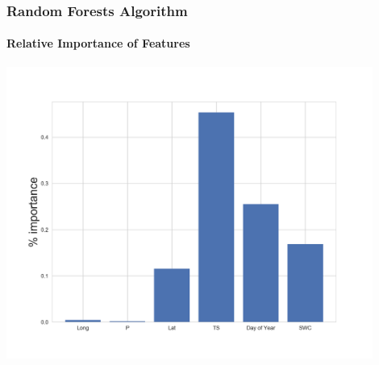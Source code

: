 \documentclass{beamer}
\begin{document}
\begin{frame}
\frametitle{Random Forests Algorithm}
\framesubtitle{Relative Importance of Features}
\centering
\includegraphics[width=0.9\textwidth]{importance.png}\\
\end{frame}




\end{document}
